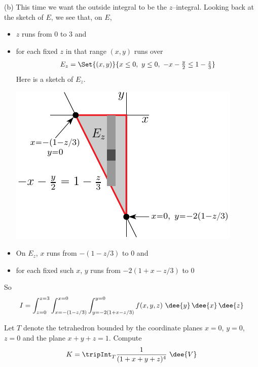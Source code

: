 \begin{solution}
(b) This time we want the outside integral to be the $z$--integral.
Looking back at the sketch of $E$, we see that, on $E$,
\begin{itemize}
\item 
$z$ runs from $0$ to $3$ and
\item
for each fixed $z$ in that range $(x,y)$ runs over
\begin{align*}
E_z=\Set{(x,y)}{x\le 0,\ y\le 0,\ -x-\tfrac{y}{2}\le 1-\tfrac{z}{3}}
\end{align*}
Here is a sketch of $E_z$.
\begin{center}
     \includegraphics{fig/OE09A_8b.pdf}
\end{center}

\item
On $E_z$, $x$ runs from $-(1-z/3)$ to $0$ and
\item
for each fixed such $x$, $y$ runs from $-2(1+x-z/3)$ to $0$
\end{itemize}
So
\begin{align*}
I = \int_{z=0}^{z=3}\int_{x=-(1-z/3)}^{x=0}\int_{y=-2(1+x-z/3)}^{y=0} f(x,y,z)\ 
                                      \dee{y}\,\dee{x}\,\dee{z}
\end{align*}
\end{solution}

\begin{question}[M200 2010D] %
Let $T$ denote the tetrahedron bounded by the coordinate planes $x = 0$, $y = 0$, $z = 0$ and
the plane $x + y + z = 1$. Compute
\begin{equation*}
K = \tripInt_T \frac{1}{ (1 + x + y + z)^4}\ \dee{V}
\end{equation*}
\end{question}

%

